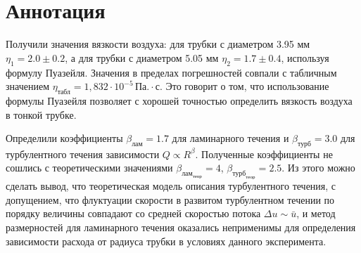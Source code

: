 \chapter*{Аннотация}

Получили значения вязкости воздуха: для трубки с диаметром 3.95 мм $\eta_1 = 2.0 \pm 0.2$, а для трубки с диаметром 5.05 мм $\eta_2 = 1.7 \pm 0.4$, используя формулу Пуазейля. Значения в пределах погрешностей совпали с табличным значением $\eta_{\text{табл}} =  1,832 \cdot 10^{-5} \, \text{Па}. \cdot \text{с}$. Это говорит о том, что использование формулы Пуазейля позволяет с хорошей точностью определить вязкость воздуха в тонкой трубке.

Определили коэффициенты $\beta_\text{лам} = 1.7$ для ламинарного течения и $\beta_\text{турб} = 3.0$ для турбулентного течения зависимости $Q \propto R^\beta$. Полученные коэффициенты не сошлись с теоретическими значениями $\beta_{\text{лам}_\text{теор}} = 4$,  $\beta_{\text{турб}_\text{теор}} = 2.5$. Из этого можно сделать вывод, что теоретическая модель описания турбулентного течения, с допущением, что флуктуации скорости в развитом турбулентном течении по порядку величины совпадают со средней скоростью потока $\Delta u \sim  \bar{u}$, и метод размерностей для ламинарного течения оказались неприменимы для определения зависимости расхода от радиуса трубки в условиях данного эксперимента.